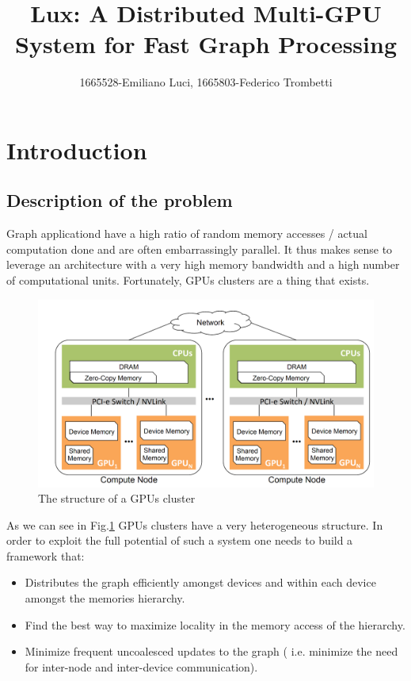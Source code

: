 \documentclass[]{article}
\title{Lux: A Distributed Multi-GPU System for Fast Graph Processing}
\author{1665528-Emiliano Luci, 1665803-Federico Trombetti}
\begin{document}
\maketitle

\section{Introduction}
\subsection{Description of the problem}
Graph applicationd have a high ratio of random memory accesses / actual computation done and are often embarrassingly parallel. It thus makes sense to leverage an architecture with a very high memory bandwidth and a high number of computational units. Fortunately, GPUs clusters are a thing that exists. 

\begin{figure}[H]

	\centering
	\includegraphics[width=0.7\linewidth]{gpu_cluster.png}
	\caption{The structure of a GPUs cluster}
	\label{fig:gpu_cluster}
\end{figure}
As we can see in Fig.\ref{fig:gpu_cluster} GPUs clusters have a very heterogeneous structure. In order to exploit the full potential of such a system one needs to build a framework that:
\begin{itemize}
	\item Distributes the graph efficiently amongst devices and within each device amongst the memories hierarchy.
	\item Find the best way to maximize locality in the memory access of the hierarchy.
	\item Minimize frequent uncoalesced updates to the graph ( i.e. minimize the need for inter-node and inter-device communication).
\end{itemize}
\end{document}
